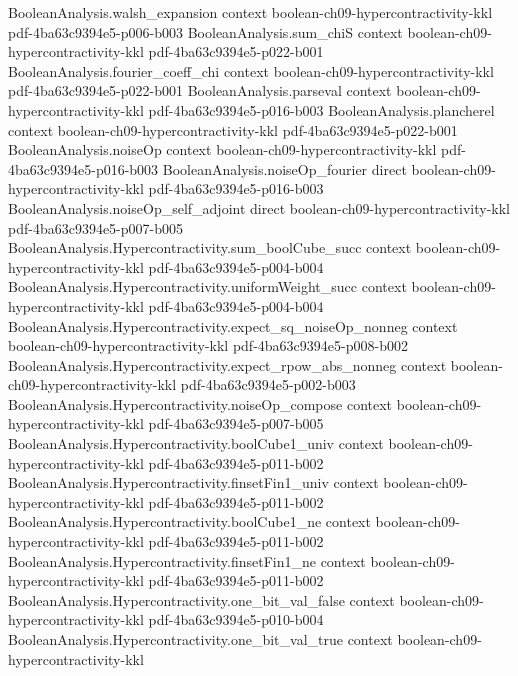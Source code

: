 \begin{theorem}
  {BooleanAnalysis.walsh_expansion}
  {context}
  {boolean-ch09-hypercontractivity-kkl}
  {pdf-4ba63c9394e5-p006-b003}
\proofstep
  {BooleanAnalysis.sum_chiS}
  {context}
  {boolean-ch09-hypercontractivity-kkl}
  {pdf-4ba63c9394e5-p022-b001}
\proofstep
  {BooleanAnalysis.fourier_coeff_chi}
  {context}
  {boolean-ch09-hypercontractivity-kkl}
  {pdf-4ba63c9394e5-p022-b001}
\proofstep
  {BooleanAnalysis.parseval}
  {context}
  {boolean-ch09-hypercontractivity-kkl}
  {pdf-4ba63c9394e5-p016-b003}
\proofstep
  {BooleanAnalysis.plancherel}
  {context}
  {boolean-ch09-hypercontractivity-kkl}
  {pdf-4ba63c9394e5-p022-b001}
\proofstep
  {BooleanAnalysis.noiseOp}
  {context}
  {boolean-ch09-hypercontractivity-kkl}
  {pdf-4ba63c9394e5-p016-b003}
\proofstep
  {BooleanAnalysis.noiseOp_fourier}
  {direct}
  {boolean-ch09-hypercontractivity-kkl}
  {pdf-4ba63c9394e5-p016-b003}
\proofstep
  {BooleanAnalysis.noiseOp_self_adjoint}
  {direct}
  {boolean-ch09-hypercontractivity-kkl}
  {pdf-4ba63c9394e5-p007-b005}
\proofstep
  {BooleanAnalysis.Hypercontractivity.sum_boolCube_succ}
  {context}
  {boolean-ch09-hypercontractivity-kkl}
  {pdf-4ba63c9394e5-p004-b004}
\proofstep
  {BooleanAnalysis.Hypercontractivity.uniformWeight_succ}
  {context}
  {boolean-ch09-hypercontractivity-kkl}
  {pdf-4ba63c9394e5-p004-b004}
\proofstep
  {BooleanAnalysis.Hypercontractivity.expect_sq_noiseOp_nonneg}
  {context}
  {boolean-ch09-hypercontractivity-kkl}
  {pdf-4ba63c9394e5-p008-b002}
\proofstep
  {BooleanAnalysis.Hypercontractivity.expect_rpow_abs_nonneg}
  {context}
  {boolean-ch09-hypercontractivity-kkl}
  {pdf-4ba63c9394e5-p002-b003}
\proofstep
  {BooleanAnalysis.Hypercontractivity.noiseOp_compose}
  {context}
  {boolean-ch09-hypercontractivity-kkl}
  {pdf-4ba63c9394e5-p007-b005}
\proofstep
  {BooleanAnalysis.Hypercontractivity.boolCube1_univ}
  {context}
  {boolean-ch09-hypercontractivity-kkl}
  {pdf-4ba63c9394e5-p011-b002}
\proofstep
  {BooleanAnalysis.Hypercontractivity.finsetFin1_univ}
  {context}
  {boolean-ch09-hypercontractivity-kkl}
  {pdf-4ba63c9394e5-p011-b002}
\proofstep
  {BooleanAnalysis.Hypercontractivity.boolCube1_ne}
  {context}
  {boolean-ch09-hypercontractivity-kkl}
  {pdf-4ba63c9394e5-p011-b002}
\proofstep
  {BooleanAnalysis.Hypercontractivity.finsetFin1_ne}
  {context}
  {boolean-ch09-hypercontractivity-kkl}
  {pdf-4ba63c9394e5-p011-b002}
\proofstep
  {BooleanAnalysis.Hypercontractivity.one_bit_val_false}
  {context}
  {boolean-ch09-hypercontractivity-kkl}
  {pdf-4ba63c9394e5-p010-b004}
\proofstep
  {BooleanAnalysis.Hypercontractivity.one_bit_val_true}
  {context}
  {boolean-ch09-hypercontractivity-kkl}

\end{theorem}
